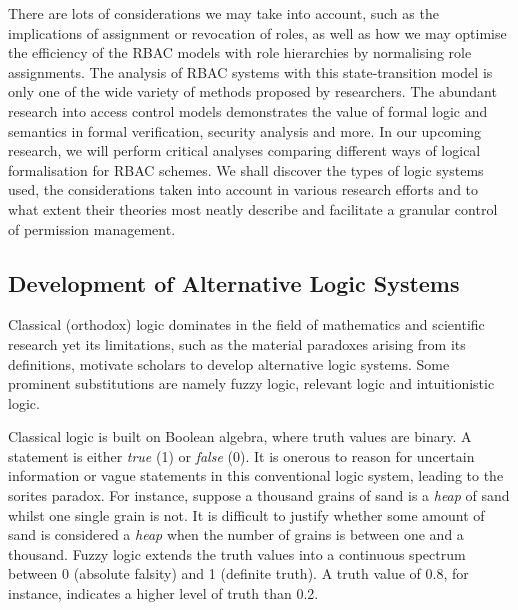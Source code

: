 \documentclass{article}
\begin{document}
There are lots of considerations we may take into account, such as the
implications of assignment or revocation of roles, as well as how we may
optimise the efficiency of the RBAC models with role hierarchies by normalising
role assignments. The analysis of RBAC systems with this state-transition
model is only one of the wide variety of methods proposed by researchers. The
abundant research into access control models demonstrates the value of formal
logic and semantics in formal verification, security analysis and more. In
our upcoming research, we will perform critical analyses comparing different
ways of logical formalisation for RBAC schemes. We shall discover the types
of logic systems used, the considerations taken into account in various
research efforts and to what extent their theories most neatly describe and
facilitate a granular control of permission management.

\subsection{Development of Alternative Logic Systems}

Classical (orthodox) logic dominates in the field of mathematics and
scientific research yet its limitations, such as the material paradoxes
arising from its definitions, motivate scholars to develop alternative logic
systems. Some prominent substitutions are namely fuzzy logic, relevant logic
and intuitionistic logic.\cite{alternative-logic}

Classical logic is built on Boolean algebra, where truth values are binary. A
statement is either \textit{true} (1) or \textit{false} (0). It is onerous to
reason for uncertain information or vague statements in this conventional logic
system, leading to the sorites paradox.\cite{alternative-logic} For instance,
suppose a thousand grains of sand is a \textit{heap} of sand whilst one
single grain is not. It is difficult to justify whether some amount of sand
is considered a \textit{heap} when the number of grains is between one and
a thousand. Fuzzy logic extends the truth values into a continuous spectrum
between 0 (absolute falsity) and 1 (definite truth). A truth value of 0.8,
for instance, indicates a higher level of truth than 0.2.
\end{document}
